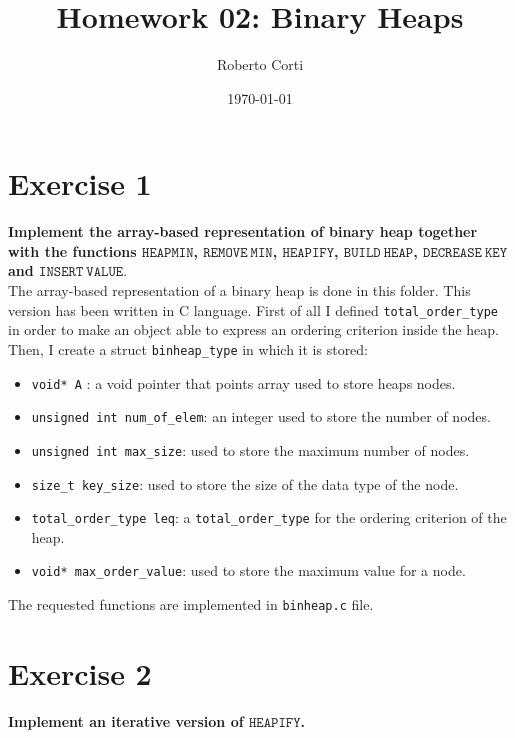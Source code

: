 \documentclass{article}
\title{Homework 02: Binary Heaps}
\date{\today}
\author{Roberto Corti}
\begin{document}
	\maketitle
	
	\section*{Exercise 1}
	\textbf{Implement the array-based representation of binary heap together with the functions $\mathtt{HEAP MIN}$, $\mathtt{REMOVE ~ MIN}$, $\mathtt{HEAPIFY}$, $\mathtt{BUILD ~  HEAP}$, $\mathtt{DECREASE ~ KEY}$ and $\mathtt{INSERT ~ VALUE}$}. \\
	
	\noindent The array-based representation of a binary heap is done in this folder. This version has been written in C language. 
	First of all I defined \texttt{total\_order\_type} in order to make an object able to express an ordering criterion inside the heap. Then, I create a struct \texttt{binheap\_type} in which it is stored:
	\begin{itemize}
		\item \texttt{void* A} : a void pointer that points array used to store heaps nodes.
		\item \texttt{unsigned int num\_of\_elem}: an integer used to store the number of nodes.
		\item \texttt{unsigned int max\_size}: used to store the maximum number of nodes.
		\item \texttt{size\_t key\_size}: used to store the size of the data type of the node.
		\item \texttt{total\_order\_type leq}: a \texttt{total\_order\_type} for the ordering criterion of the heap.
		\item \texttt{void* max\_order\_value}: used to store the maximum value for a node.
	\end{itemize}

	The requested functions are implemented in \texttt{binheap.c} file.
		
	\section*{Exercise 2}
	\textbf{Implement an iterative version of $\mathtt{HEAPIFY}$.} \\
	
\end{document}
